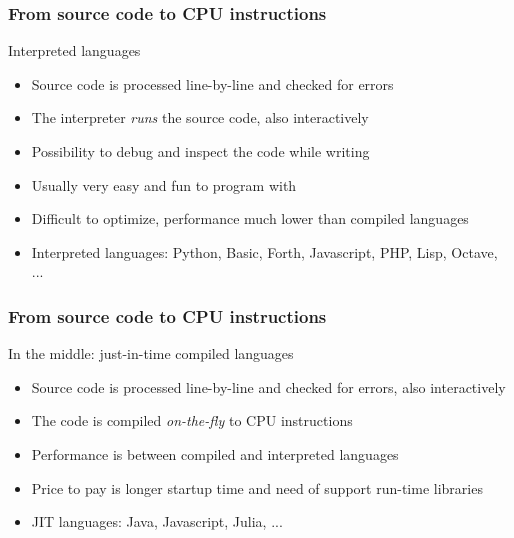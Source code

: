 \documentclass[handout]{beamer}
\begin{document}
\begin{frame}[fragile]
  \frametitle{From source code to CPU instructions}
  \begin{block}{Interpreted languages}
  \begin{itemize}
  \item Source code is processed line-by-line and checked for errors\pause
  \item The interpreter \emph{runs} the source code, also interactively\pause
  \item Possibility to debug and inspect the code while writing\pause
  \item Usually very easy and fun to program with\pause
  \item Difficult to optimize, performance much lower than compiled languages\pause
  \item Interpreted languages: Python, Basic, Forth, Javascript, PHP, Lisp, Octave, ...
  \end{itemize}
  \end{block}
\end{frame}

\begin{frame}[fragile]
  \frametitle{From source code to CPU instructions}
  \begin{block}{In the middle: just-in-time compiled languages}
  \begin{itemize}
  \item Source code is processed line-by-line and checked for errors,
        also interactively\pause
  \item The code is compiled \emph{on-the-fly} to CPU instructions\pause
  \item Performance is between compiled and interpreted languages\pause
  \item Price to pay is longer startup time and need of support run-time
        libraries\pause
  \item JIT languages: Java, Javascript, Julia, ...
  \end{itemize}
  \end{block}
\end{frame}
\end{document}
